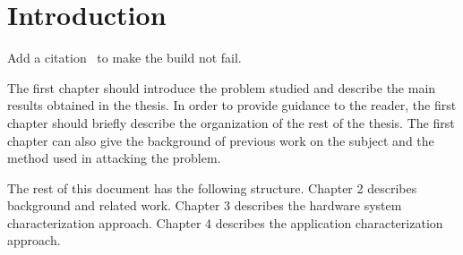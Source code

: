 
\chapter{Introduction}
Add a citation~\cite{IEEEexample:urlsty} to make the build not fail.

The first chapter should introduce the problem studied and describe the main results obtained in the thesis.
In order to provide guidance to the reader, the first chapter should briefly describe the organization of the rest of the thesis.
The first chapter can also give the background of previous work on the subject and the method used in attacking the problem.

\outline{

}



The rest of this document has the following structure.
Chapter 2 describes background and related work.
Chapter 3 describes the hardware system characterization approach.
Chapter 4 describes the application characterization approach.